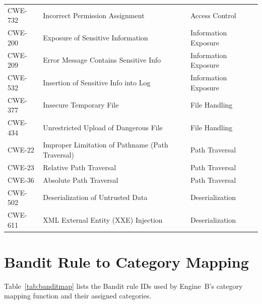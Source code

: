 \documentclass[12pt,a4paper]{report}
\begin{document}
\begin{longtable}{@{}lll@{}}
CWE-732 & Incorrect Permission Assignment        & Access Control \\
CWE-200 & Exposure of Sensitive Information      & Information Exposure \\
CWE-209 & Error Message Contains Sensitive Info  & Information Exposure \\
CWE-532 & Insertion of Sensitive Info into Log   & Information Exposure \\
CWE-377 & Insecure Temporary File                & File Handling \\
CWE-434 & Unrestricted Upload of Dangerous File  & File Handling \\
CWE-22  & Improper Limitation of Pathname (Path Traversal) & Path Traversal \\
CWE-23  & Relative Path Traversal                & Path Traversal \\
CWE-36  & Absolute Path Traversal                & Path Traversal \\
CWE-502 & Deserialization of Untrusted Data      & Deserialization \\
CWE-611 & XML External Entity (XXE) Injection    & Deserialization \\
\end{longtable}

\chapter{Bandit Rule to Category Mapping}
\label{app:banditmap}

Table~\ref{tab:banditmap} lists the Bandit rule IDs used by Engine~B's category
mapping function and their assigned categories.
\end{document}
